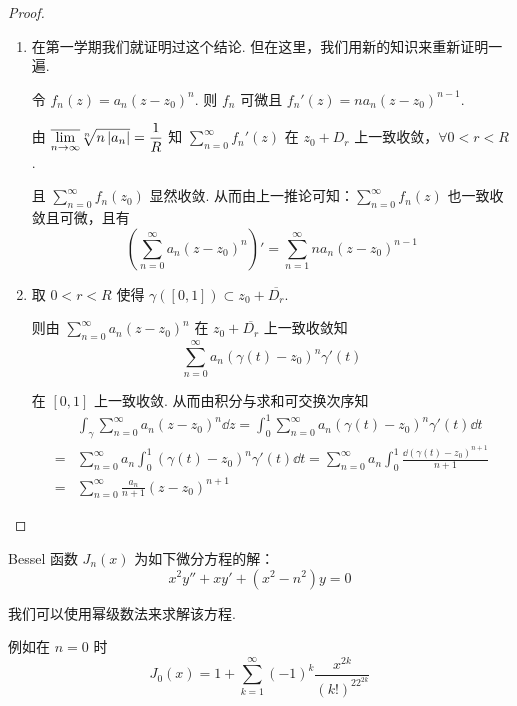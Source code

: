 \begin{proof}
    \begin{enumerate}
        \item 在第一学期我们就证明过这个结论. 但在这里，我们用新的知识来重新证明一遍.
        
        令 $f_n(z)=a_n(z-z_0)^n$. 则 $f_n$ 可微且 $f_n'(z)=na_n(z-z_0)^{n-1}$.

        由 $\overline{\lim\limits_{n\to\infty}}\sqrt[n]{n\left\lvert{a_n}\right\rvert}=\dfrac{1}{R}$ 知 $\sum\limits_{n=0}^\infty f_n'(z)$ 在 $z_0+D_r$ 上一致收敛，$\forall 0<r<R$.

        且 $\sum\limits_{n=0}^\infty f_n(z_0)$ 显然收敛. 从而由上一推论可知：$\sum\limits_{n=0}^\infty f_n(z)$ 也一致收敛且可微，且有
$$
\left(\sum_{n=0}^\infty a_n(z-z_0)^n\right)'=\sum_{n=1}^\infty na_n(z-z_0)^{n-1}
$$

        \item 取 $0<r<R$ 使得 $\gamma([0,1])\subset z_0+\overline{D_r}$.
        
        则由 $\sum\limits_{n=0}^\infty a_n(z-z_0)^n$ 在 $z_0+\overline{D_r}$ 上一致收敛知
$$
\sum\limits_{n=0}^\infty a_n(\gamma(t)-z_0)^n\gamma'(t)
$$

        在 $[0,1]$ 上一致收敛. 从而由积分与求和可交换次序知
$$
\begin{aligned}
    &\int_\gamma\sum\limits_{n=0}^\infty a_n(z-z_0)^n\dd z=\int_0^1\sum\limits_{n=0}^\infty a_n(\gamma(t)-z_0)^n\gamma'(t)\dd t\\
    =&\sum\limits_{n=0}^\infty a_n\int_0^1(\gamma(t)-z_0)^n\gamma'(t)\dd t=\sum_{n=0}^\infty a_n\int_0^1\frac{\dd(\gamma(t)-z_0)^{n+1}}{n+1}\\
    =&\sum\limits_{n=0}^\infty \frac{a_n}{n+1}(z-z_0)^{n+1}
\end{aligned}
$$
    \end{enumerate}
\end{proof}

\begin{example}
    Bessel 函数 $J_n(x)$ 为如下微分方程的解：
$$
x^2y''+xy'+(x^2-n^2)y=0
$$

    我们可以使用幂级数法来求解该方程.

    例如在 $n=0$ 时
$$
J_0(x)=1+\sum\limits_{k=1}^\infty(-1)^k\frac{x^{2k}}{(k!)^22^{2k}}
$$
\end{example}